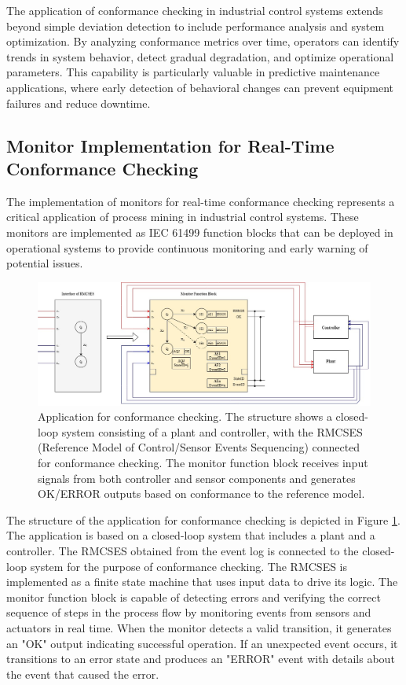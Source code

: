 The application of conformance checking in industrial control systems extends beyond simple deviation detection to include performance analysis and system optimization. By analyzing conformance metrics over time, operators can identify trends in system behavior, detect gradual degradation, and optimize operational parameters. This capability is particularly valuable in predictive maintenance applications, where early detection of behavioral changes can prevent equipment failures and reduce downtime.

\subsection{Monitor Implementation for Real-Time Conformance Checking}

The implementation of monitors for real-time conformance checking represents a critical application of process mining in industrial control systems. These monitors are implemented as IEC 61499 function blocks that can be deployed in operational systems to provide continuous monitoring and early warning of potential issues.

\begin{figure}[!t]
	\centering
	\includegraphics[width=1\textwidth]{chapters/images/chapter4/ConformaceCheckingApp.jpg}
	\caption{Application for conformance checking. The structure shows a closed-loop system consisting of a plant and controller, with the RMCSES (Reference Model of Control/Sensor Events Sequencing) connected for conformance checking. The monitor function block receives input signals from both controller and sensor components and generates OK/ERROR outputs based on conformance to the reference model.}
	\label{conformanceCheckingApp}
\end{figure}

The structure of the application for conformance checking is depicted in Figure \ref{conformanceCheckingApp}. The application is based on a closed-loop system that includes a plant and a controller. The RMCSES obtained from the event log is connected to the closed-loop system for the purpose of conformance checking. The RMCSES is implemented as a finite state machine that uses input data to drive its logic. The monitor function block is capable of detecting errors and verifying the correct sequence of steps in the process flow by monitoring events from sensors and actuators in real time. When the monitor detects a valid transition, it generates an "OK" output indicating successful operation. If an unexpected event occurs, it transitions to an error state and produces an "ERROR" event with details about the event that caused the error.

